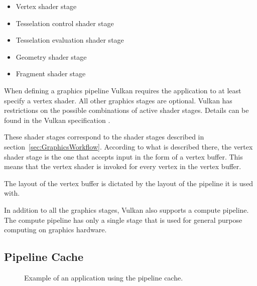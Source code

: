     \begin{itemize}
      \item Vertex shader stage
      \item Tesselation control shader stage
      \item Tesselation evaluation shader stage
      \item Geometry shader stage
      \item Fragment shader stage
    \end{itemize}

    When defining a graphics pipeline Vulkan requires the application to at least specify a vertex shader. All other graphics stages are optional. Vulkan has restrictions on the possible combinations of active shader stages. Details can be found in the Vulkan specification \cite{vkspec}.



    These shader stages correspond to the shader stages described in section~\ref{sec:GraphicsWorkflow}. According to what is described there, the vertex shader stage is the one that accepts input in the form of a vertex buffer. This means that the vertex shader is invoked for every vertex in the vertex buffer.

    The layout of the vertex buffer is dictated{} by the layout of the pipeline it is used with.

    In addition to all the graphics stages, Vulkan also supports a compute pipeline. The compute pipeline has only a single stage that is used for general purpose computing on graphics hardware.

    \subsection{Pipeline Cache}
    \label{subsec:PipelineCache}

      \begin{figure}
        \caption{Example of an application using the pipeline cache.}
        \centering
        \label{fig:PipelineCache}
      \end{figure}

